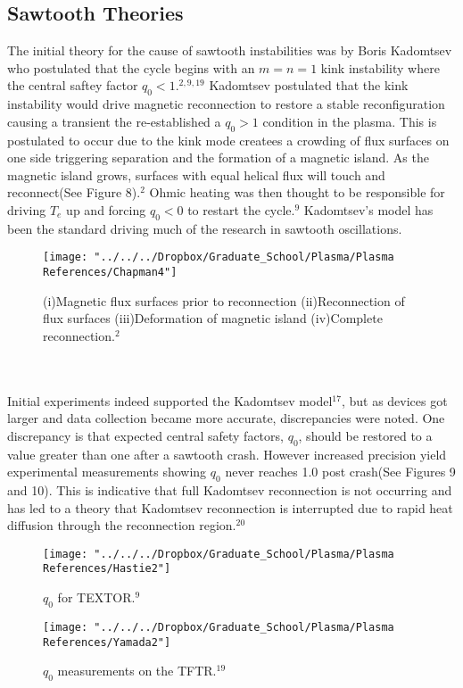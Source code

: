\documentclass{article}
\begin{document}
\subsection{Sawtooth Theories}
The initial theory for the cause of sawtooth instabilities was by Boris Kadomtsev who postulated that the cycle begins with an $m=n=1$ kink instability where the central saftey factor $q_0<1$.$^{2,9,19}$  Kadomtsev postulated that the kink instability would drive magnetic reconnection to restore a stable reconfiguration causing a transient the re-established a $q_0>1$ condition in the plasma.  This is postulated to occur due to the kink mode createes a crowding of flux surfaces on one side triggering separation and the formation of a magnetic island.  As the magnetic island grows, surfaces with equal helical flux will touch and reconnect(See Figure 8).$^{2}$  Ohmic heating was then thought to be responsible for driving $T_e$ up and forcing $q_0<0$ to restart the cycle.$^{9}$  Kadomtsev's model has been the standard driving much of the research in sawtooth oscillations.
\begin{figure}[h]
\centering
\texttt{[image: "../../../Dropbox/Graduate\_School/Plasma/Plasma References/Chapman4"]}
\caption{(i)Magnetic flux surfaces prior to reconnection (ii)Reconnection of flux surfaces (iii)Deformation of magnetic island (iv)Complete reconnection.$^{2}$}
\label{fig:Chapman4}
\end{figure}
\\\\Initial experiments indeed supported the Kadomtsev model$^{17}$, but as devices got larger and data collection became more accurate, discrepancies were noted.  One discrepancy is that expected central safety factors, $q_0$, should be restored to a value greater than one after a sawtooth crash.  However increased precision yield experimental measurements showing $q_0$ never reaches 1.0 post crash(See Figures 9 and 10).  This is indicative that full Kadomtsev reconnection is not occurring and has led to a theory that Kadomtsev reconnection is interrupted due to rapid heat diffusion through the reconnection region.$^{20}$
\begin{figure}[h]
\centering
\texttt{[image: "../../../Dropbox/Graduate\_School/Plasma/Plasma References/Hastie2"]}
\caption{$q_0$ for TEXTOR.$^{9}$}
\label{fig:Hastie2}
\end{figure}
\begin{figure}[h]
\centering
\texttt{[image: "../../../Dropbox/Graduate\_School/Plasma/Plasma References/Yamada2"]}
\caption{$q_0$ measurements on the TFTR.$^{19}$}
\label{fig:Yamada2}
\end{figure}
\end{document}
